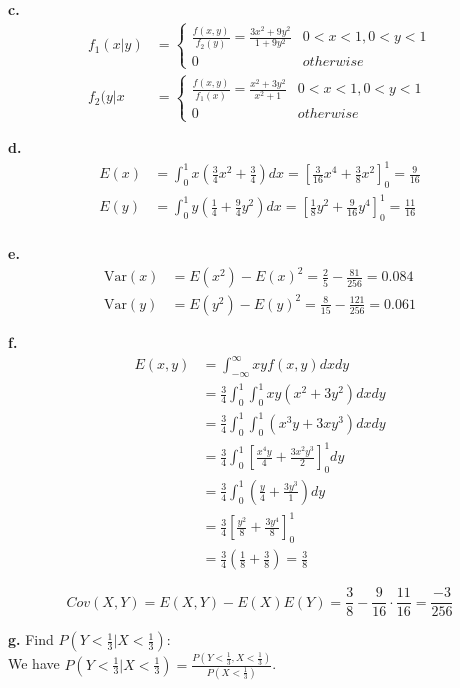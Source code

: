 \documentclass[12pt]{report}
\newcommand{\twopartdef}[4]
{
	\left\{
	\begin{array}{ll}
		#1 & \mbox{} #2 \\
		#3 & \mbox{} #4
	\end{array}
	\right.
}
\begin{document}
\noindent \textbf{c.}
\begin{align*}
f_1(x|y) &= \twopartdef{\frac{f(x,y)}{f_2(y )} = \frac{3x^2 + 9y^2}{1+9y^2}}{0 < x < 1, 0 < y < 1}{0}{otherwise}\\
f_2(y|x &= \twopartdef{\frac{f(x,y)}{f_1(x)} = \frac{x^2 + 3y^2}{x^2+1}}{0 < x < 1, 0 < y < 1}{0}{otherwise}
\end{align*}

\noindent \textbf{d.}
\begin{align*}
E(x) &= \int_0^1x\left(\frac{3}{4}x^2 + \frac{3}{4}\right)dx = \left[\frac{3}{16}x^4 + \frac{3}{8}x^2\right]_0^1 = \boxed{\frac{9}{16}}\\
E(y) &= \int_0^1y\left(\frac{1}{4} + \frac{9}{4}y^2\right)dx = \left[\frac{1}{8}y^2 + \frac{9}{16}y^4\right]_0^1 = \boxed{\frac{11}{16}}\\
\end{align*}

\noindent \textbf{e.}
\begin{align*}
\text{Var}(x) &= E(x^2) - E(x)^2 = \frac{2}{5} - \frac{81}{256} = \boxed{0.084}	\\
\text{Var}(y) &= E(y^2) - E(y)^2 = \frac{8}{15} - \frac{121}{256} = \boxed{0.061}
\end{align*}

\noindent \textbf{f.}
\begin{align*}
E(x,y) &= \int_{-\infty}^{\infty}xyf(x,y)dxdy\\
&= \frac{3}{4}\int_{0}^{1}\int_{0}^{1}xy(x^2 + 3y^2)dxdy\\
&= \frac{3}{4}\int_{0}^{1}\int_0^1(x^3y + 3xy^3)dxdy\\
&= \frac{3}{4}\int_0^1\left[\frac{x^4y}{4} + \frac{3x^2y^3}{2}\right]_0^1dy\\
&= \frac{3}{4}\int_{0}^{1}\left(\frac{y}{4} + \frac{3y^3}{1}\right)dy\\
&= \frac{3}{4}\left[\frac{y^2}{8} + \frac{3y^4}{8}\right]_0^1\\
&= \frac{3}{4}\left(\frac{1}{8} + \frac{3}{8}\right) = \boxed{\frac{3}{8}}
\end{align*}

$$ Cov(X, Y) = E(X,Y) - E(X)E(Y) = \frac{3}{8} - \frac{9}{16} \cdot \frac{11}{16} = \boxed{\frac{-3}{256}}$$

\pagebreak
\noindent \textbf{g.} Find $P(Y < \frac{1}{3}|X < \frac{1}{3})$:\\

We have $P(Y < \frac{1}{3}|X < \frac{1}{3}) = \frac{P(Y < \frac{1}{3}, X < \frac{1}{3})}{P(X < \frac{1}{3})}$.
\end{document}

